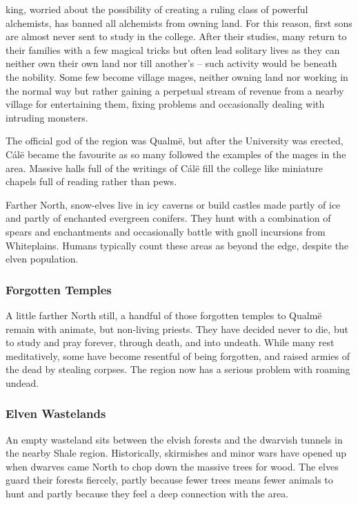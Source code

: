 \begin{multicols}{2}
\Gls{king}, worried about the possibility of creating a ruling class of powerful alchemists, has banned all alchemists from owning land.
For this reason, first sons are almost never sent to study in the college.
After their studies, many return to their families with a few magical tricks but often lead solitary lives as they can neither own their own land nor till another's -- such activity would be beneath the nobility.
Some few become village mages, neither owning land nor working in the normal way but rather gaining a perpetual stream of revenue from a nearby village for entertaining them, fixing problems and occasionally dealing with intruding monsters.

The official god of the region was Qualm\"{e}, but after the University was erected, C\'{a}l\"{e} became the favourite as so many followed the examples of the mages in the area.
Massive halls full of the writings of C\'{a}l\"{e} fill the college like miniature chapels full of reading rather than pews.

Farther North, snow-elves live in icy caverns or build castles made partly of ice and partly of enchanted evergreen conifers.
They hunt with a combination of spears and enchantments and occasionally battle with gnoll incursions from Whiteplains.
Humans typically count these areas as beyond the \gls{edge}, despite the elven population.

\subsubsection{Forgotten Temples}

A little farther North still, a handful of those forgotten temples to Qualm\"{e} remain with animate, but non-living priests.
They have decided never to die, but to study and pray forever, through death, and into undeath.
While many rest meditatively, some have become resentful of being forgotten, and raised armies of the dead by stealing corpses.
The region now has a serious problem with roaming undead.

\subsubsection{Elven Wastelands}

An empty wasteland sits between the elvish forests and the dwarvish tunnels in the nearby Shale region.
Historically, skirmishes and minor wars have opened up when dwarves came North to chop down the massive trees for wood.
The elves guard their forests fiercely, partly because fewer trees means fewer animals to hunt and partly because they feel a deep connection with the area.


\end{multicols}
